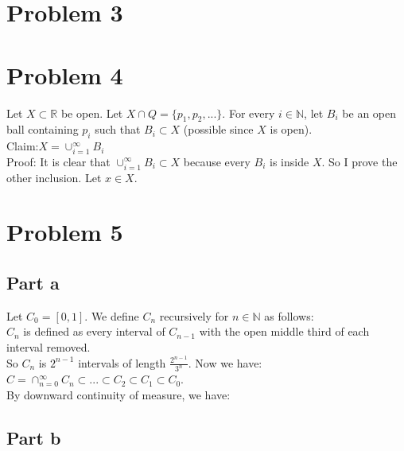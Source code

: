 \documentclass[12pt]{article}
\begin{document}
\clearpage
\section*{Problem 3}
\section*{Problem 4}
Let $X \subset \mathbb{R}$ be open. Let $X \cap Q =\{p_1,p_2,...\}$.
For every $i \in \mathbb{N}$, let $B_i$ be an open ball containing $p_i$ such that $B_i \subset X$ (possible since $X$ is open). \\
Claim:$X= \cup_{i=1}^{\infty} B_i$ \\
Proof: It is clear that $\cup_{i=1}^{\infty} B_i \subset X$ because every $B_i$ is inside $X$. So I prove the other inclusion. 
Let $x \in X $.
\section*{Problem 5}
\subsection*{Part a}
Let $C_0=[0,1]$. We define $C_n$ recursively for $n \in \mathbb{N}$ as follows: \\
$C_n$ is defined as every interval of $C_{n-1}$ with the open middle third of each interval removed. \\
So $C_n$ is $2^{n-1}$ intervals of length $\frac{2^{n-1}}{3^n}$.
Now we have:
$C=\cap_{n=0}^{\infty} C_n \subset ... \subset C_2 \subset C_1 \subset C_0$. \\
By downward continuity of measure, we have:
\subsection*{Part b}
\end{document}
